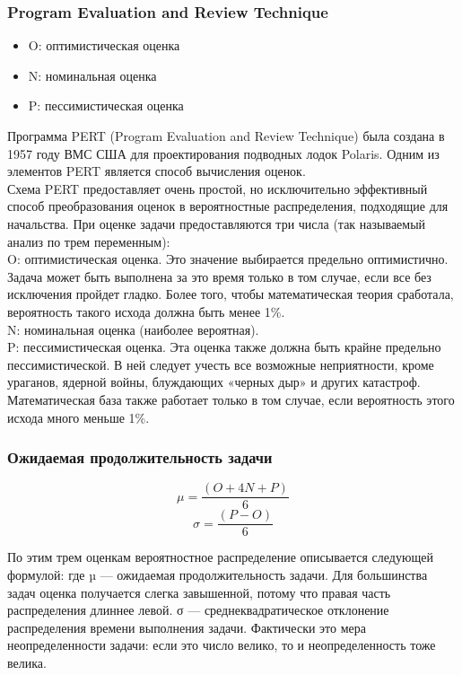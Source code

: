 \documentclass{../industrial-development}
\begin{document}
\begin{frame} \frametitle{Program Evaluation and Review Technique}
\begin{itemize}
  \item O: оптимистическая оценка
	\item N: номинальная оценка
	\item P: пессимистическая оценка
\end{itemize}
\end{frame}
\lecturenotes
Программа PERT (Program Evaluation and Review Technique) была создана в 1957 году ВМС США для проектирования подводных лодок Polaris. Одним из элементов PERT является способ вычисления оценок.\\
Схема PERT предоставляет очень простой, но исключительно эффективный способ преобразования оценок в вероятностные распределения, подходящие для начальства. При оценке задачи предоставляются три числа (так называемый анализ по трем переменным):\\
O: оптимистическая оценка. Это значение выбирается предельно оптимистично. Задача может быть выполнена за это время только в том случае, если все без исключения пройдет гладко. Более того, чтобы математическая теория сработала, вероятность такого исхода должна быть менее 1\%.\\
N: номинальная оценка (наиболее вероятная).\\
P: пессимистическая оценка. Эта оценка также должна быть крайне предельно пессимистической. В ней следует учесть все возможные неприятности, кроме ураганов, ядерной войны, блуждающих «черных дыр» и других катастроф. Математическая база также работает
только в том случае, если вероятность этого исхода много меньше 1\%.

\begin{frame} \frametitle{Ожидаемая продолжительность задачи}
	\[\mu = \frac{(O + 4N + P)}6\]
	\[\sigma = \frac{(P-O)}6\]
\end{frame}
\lecturenotes
По этим трем оценкам вероятностное распределение описывается следующей формулой: где µ — ожидаемая продолжительность задачи. Для большинства задач оценка получается слегка завышенной, потому что правая часть распределения длиннее левой.
σ — среднеквадратическое отклонение распределения времени выполнения задачи. Фактически это мера неопределенности задачи: если
это число велико, то и неопределенность тоже велика. 
\end{document}
